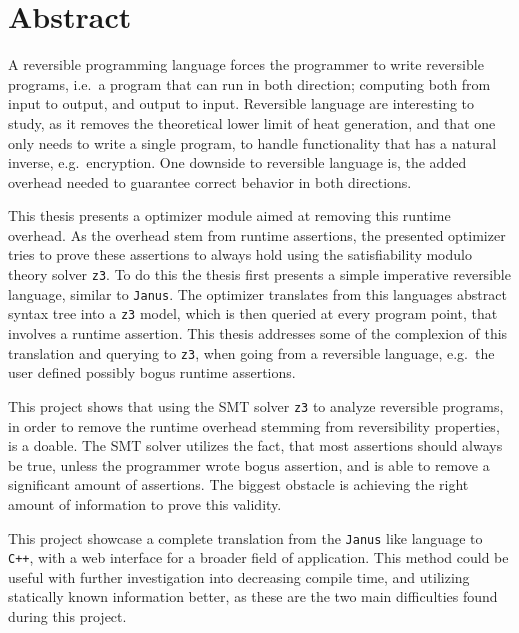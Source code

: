 \section*{Abstract}
A reversible programming language forces the programmer to write reversible programs, i.e.\
a program that can run in both direction; computing both from input to output, and output to
input. Reversible language are interesting to study, as it removes the theoretical lower limit
of heat generation, and that one only needs to write a single program, to handle functionality
that has a natural inverse, e.g.\ encryption. One downside to reversible language is, the added
overhead needed to guarantee correct behavior in both directions.

This thesis presents a optimizer module aimed at removing this runtime overhead. As the overhead
stem from runtime assertions, the presented optimizer tries to prove these assertions to always
hold using the satisfiability modulo  theory solver \texttt{z3}. To do this the thesis first
presents a simple imperative reversible language, similar to \texttt{Janus}. The optimizer
translates from this languages abstract syntax tree into a \texttt{z3} model, which is then
queried at every program point, that involves a runtime assertion. This thesis addresses some
of the complexion of this translation and querying to \texttt{z3}, when going from a reversible
language, e.g.\ the user defined possibly bogus runtime assertions.

This project shows that using the SMT solver \texttt{z3} to analyze reversible programs, in order
to remove the runtime overhead stemming from reversibility properties, is a doable. The SMT solver
utilizes the fact, that most assertions should always be true, unless the programmer wrote bogus
assertion, and is able to remove a significant amount of assertions. The biggest obstacle is
achieving the right amount of information to prove this validity.

This project showcase a complete translation from the \texttt{Janus} like language \lan to
\texttt{C++}, with a web interface for a broader field of application. This method could be useful
with further investigation into decreasing compile time, and utilizing statically known information
better, as these are the two main difficulties found during this project.